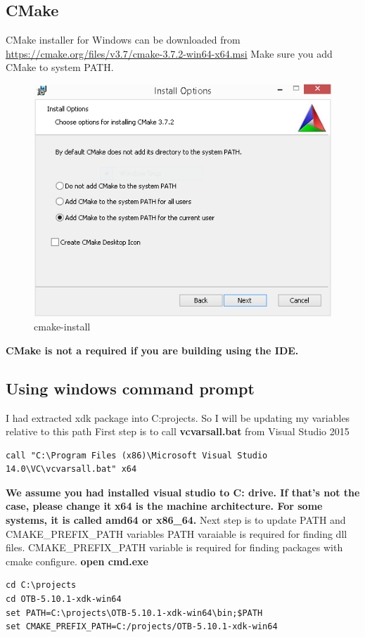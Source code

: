 \documentclass[10pt,a4paper]{article}
\begin{document}
\subsection{CMake}
CMake installer for Windows can be downloaded from \url{https://cmake.org/files/v3.7/cmake-3.7.2-win64-x64.msi}
\newline
Make sure you add CMake to system PATH.
\begin{figure}[h]
  \center
  \includegraphics[width=1\textwidth]{Art/cmake-install.png}
  \caption[]{cmake-install}
  \label{fig:cmake-install}
\end{figure}

\textbf{CMake is not a required if you are building using the IDE.}

\subsection{Using windows command prompt}
I had extracted xdk package into C:projects. So I will be updating my variables relative to this path
\newline
First step is to call \textbf{vcvarsall.bat} from Visual Studio 2015
\newline
\begin{verbatim}
call "C:\Program Files (x86)\Microsoft Visual Studio 14.0\VC\vcvarsall.bat" x64
\end{verbatim}
\textbf{We assume you had installed visual studio to C: drive. If that's not the case, please change it}
\textbf{x64 is the machine architecture. For some systems, it is called amd64 or x86\_64.}
\newline
Next step is to update PATH and CMAKE\_PREFIX\_PATH variables
\newline
PATH varaiable is required for finding dll files.
\newline
CMAKE\_PREFIX\_PATH variable is required for finding packages with cmake configure.
\newline
\newline
\textbf{open cmd.exe}
\begin{verbatim}
cd C:\projects
cd OTB-5.10.1-xdk-win64 
set PATH=C:\projects\OTB-5.10.1-xdk-win64\bin;$PATH
set CMAKE_PREFIX_PATH=C:/projects/OTB-5.10.1-xdk-win64
\end{verbatim}
\end{document}
